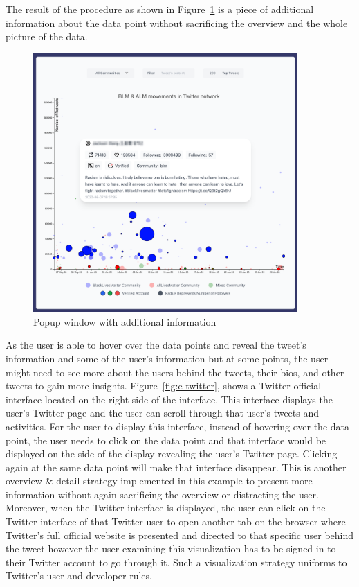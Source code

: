
The result of the procedure as shown in Figure~\ref{fig:e-popup} is a piece of additional information about the data point without sacrificing the overview and the whole picture of the data.


\begin{figure}[H]
\centering
\captionsetup{justification=centering}
\includegraphics[width=0.9\textwidth]{./pics/popup.png}
\caption{Popup window with additional information}
\label{fig:e-popup}
\end{figure}

As the user is able to hover over the data points and reveal the tweet's information and some of the user's information but at some points, the user might need to see more about the users behind the tweets, their bios, and other tweets to gain more insights. Figure~\ref{fig:e-twitter}, shows a Twitter official interface located on the right side of the interface. This interface displays the user's Twitter page and the user can scroll through that user's tweets and activities. For the user to display this interface, instead of hovering over the data point, the user needs to click on the data point and that interface would be displayed on the side of the display revealing the user's Twitter page. Clicking again at the same data point will make that interface disappear. This is another overview \& detail strategy implemented in this example to present more information without again sacrificing the overview or distracting the user. Moreover, when the Twitter interface is displayed, the user can click on the Twitter interface of that Twitter user to open another tab on the browser where Twitter's full official website is presented and directed to that specific user behind the tweet however the user examining this visualization has to be signed in to their Twitter account to go through it. Such a visualization strategy uniforms to Twitter's user and developer rules.


